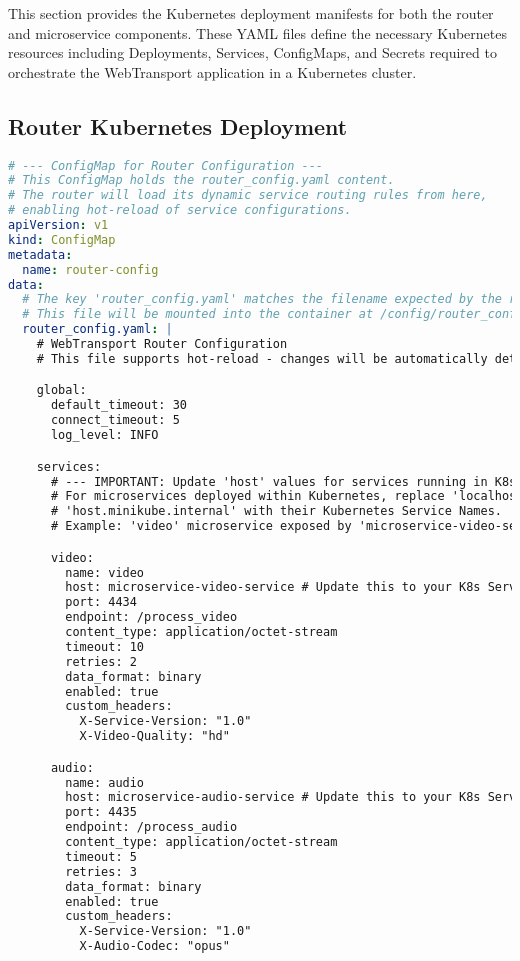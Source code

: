 This section provides the Kubernetes deployment manifests for both the router and microservice components. These YAML files define the necessary Kubernetes resources including Deployments, Services, ConfigMaps, and Secrets required to orchestrate the WebTransport application in a Kubernetes cluster.

\subsection{Router Kubernetes Deployment}
\begin{lstlisting}[breaklines=true, caption={Router Kubernetes Deployment}, language=yaml]
# --- ConfigMap for Router Configuration ---
# This ConfigMap holds the router_config.yaml content.
# The router will load its dynamic service routing rules from here,
# enabling hot-reload of service configurations.
apiVersion: v1
kind: ConfigMap
metadata:
  name: router-config
data:
  # The key 'router_config.yaml' matches the filename expected by the router.
  # This file will be mounted into the container at /config/router_config.yaml.
  router_config.yaml: |
    # WebTransport Router Configuration
    # This file supports hot-reload - changes will be automatically detected

    global:
      default_timeout: 30
      connect_timeout: 5
      log_level: INFO

    services:
      # --- IMPORTANT: Update 'host' values for services running in K8s ---
      # For microservices deployed within Kubernetes, replace 'localhost' or
      # 'host.minikube.internal' with their Kubernetes Service Names.
      # Example: 'video' microservice exposed by 'microservice-video-service'.

      video:
        name: video
        host: microservice-video-service # Update this to your K8s Service Name
        port: 4434
        endpoint: /process_video
        content_type: application/octet-stream
        timeout: 10
        retries: 2
        data_format: binary
        enabled: true
        custom_headers:
          X-Service-Version: "1.0"
          X-Video-Quality: "hd"

      audio:
        name: audio
        host: microservice-audio-service # Update this to your K8s Service Name
        port: 4435
        endpoint: /process_audio
        content_type: application/octet-stream
        timeout: 5
        retries: 3
        data_format: binary
        enabled: true
        custom_headers:
          X-Service-Version: "1.0"
          X-Audio-Codec: "opus"


\end{lstlisting}
